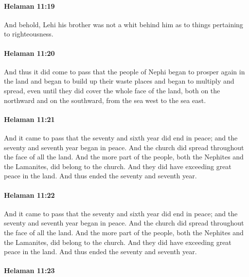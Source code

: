 		\paragraph{Helaman 11:19} %
			\label{HELAMAN-11-19}

			And behold, Lehi his brother was not a whit behind him
			as to things pertaining to righteousness.

		\paragraph{Helaman 11:20} %
			\label{HELAMAN-11-20}

			And thus it did come to pass that
			the people of Nephi began to prosper again in the land
			and began to build up their waste places
			and began to multiply and spread,
			even until they did cover the whole face of the land,
			both on the northward and on the southward,
			from the sea west to the sea east.

		\paragraph{Helaman 11:21} %
			\label{HELAMAN-11-21}

			And it came to pass that the seventy and sixth year did end in peace;
			and the seventy and seventh year began in peace.
			And the church did spread throughout the face of all the land.
			And the more part of the people,
			both the Nephites and the Lamanites,
			did belong to the church.
			And they did have exceeding great peace in the land.
			And thus ended the seventy and seventh year.

		\paragraph{Helaman 11:22} %
			\label{HELAMAN-11-22}

			And it came to pass that the seventy and sixth year did end in peace;
			and the seventy and seventh year began in peace.
			And the church did spread throughout the face of all the land.
			And the more part of the people,
			both the Nephites and the Lamanites,
			did belong to the church.
			And they did have exceeding great peace in the land.
			And thus ended the seventy and seventh year.

		\paragraph{Helaman 11:23} %
			\label{HELAMAN-11-23}

